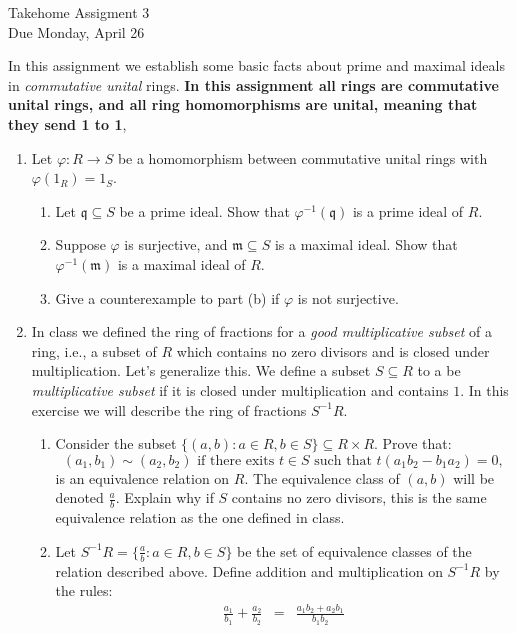 \documentclass[11pt]{article}
\newcommand{\fm}{\mathfrak{m}}
\newcommand{\fq}{\mathfrak{q}}
\begin{document}
\begin{center}
  \Large {Takehome Assigment 3}\\
  \small {Due Monday, April 26}
\end{center}
In this assignment we establish some basic facts about prime and maximal ideals in \textit{commutative unital} rings.  \textbf{In this assignment all rings are commutative unital rings, and all ring homomorphisms are unital, meaning that they send 1 to 1},
\begin{enumerate}
  \item{
  Let $\varphi:R\to S$ be a homomorphism between commutative unital rings with $\varphi(1_R)=1_S$.
  \begin{enumerate}
    \item{
    Let $\fq\subseteq S$ be a prime ideal.  Show that $\varphi^{-1}(\fq)$ is a prime ideal of $R$.
    }
    \item{
    Suppose $\varphi$ is surjective, and $\fm\subseteq S$ is a maximal ideal.  Show that $\varphi^{-1}(\fm)$ is a maximal ideal of $R$.
    }
    \item{
    Give a counterexample to part (b) if $\varphi$ is not surjective.
    }
  \end{enumerate}
  }
  \item{
  In class we defined the ring of fractions for a \textit{good multiplicative subset} of a ring, i.e., a subset of $R$ which contains no zero divisors and is closed under multiplication.  Let's generalize this.  We define a subset $S\subseteq R$ to a be \textit{multiplicative subset} if it is closed under multiplication and contains $1$.  In this exercise we will describe the ring of fractions $S^{-1}R$.
  \begin{enumerate}
    \item{
    Consider the subset $\{(a,b):a\in R,b\in S\}\subseteq R\times R$.  Prove that:
    \[(a_1,b_1)\sim(a_2,b_2)\text{ if there exits }t\in S\text{ such that }t(a_1b_2-b_1a_2)=0,\]
    is an equivalence relation on $R$.  The equivalence class of $(a,b)$ will be denoted $\frac{a}{b}$.  Explain why if $S$ contains no zero divisors, this is the same equivalence relation as the one defined in class.
    }
    \item{
    Let $S^{-1}R = \{\frac{a}{b}:a\in R,b\in S\}$ be the set of equivalence classes of the relation described above.  Define addition and multiplication on $S^{-1}R$ by the rules:
    \begin{eqnarray*}
      \frac{a_1}{b_1}+\frac{a_2}{b_2} &=& \frac{a_1b_2+a_2b_1}{b_1b_2}\\

\end{eqnarray*}}
\end{enumerate}}
\end{enumerate}
\end{document}
